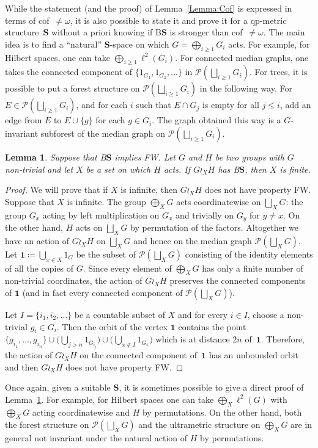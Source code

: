 \documentclass[a4paper]{article}
\newtheorem{lem}{Lemma}[section]
\theoremstyle{definition}
\newcommand*{\BS}{B$\mathbf{S}$}
\newcommand*{\powerset}[1]{\mathcal P(#1)}
\begin{document}
%
%
While the statement (and the proof) of Lemma~\ref{Lemma:Cof} is expressed in terms of cof~$\neq\omega$, it is also possible to state it and prove it for a qp-metric structure~$\mathbf{S}$ without a priori knowing if \BS{} is stronger than cof~$\neq\omega$.
The main idea is to find a ``natural'' $\mathbf S$-space on which $G=\bigoplus_{i\geq 1}G_i$ acts. For example, for Hilbert spaces, one can take $\bigoplus_{i\geq 1}\ell^2(G_i)$. For connected median graphs, one takes the connected component of $\{1_{G_1},1_{G_2},\dots\}$ in $\powerset{\bigsqcup_{i\geq 1} G_i}$.
For trees, it is possible to put a forest structure on $\powerset{\bigsqcup_{i\geq 1} G_i}$ in the following way.
For $E\in\powerset{\bigsqcup_{i\geq 1} G_i}$, and for each $i$ such that $E\cap G_j$ is empty for all $j\leq i$, add an edge from $E$ to $E\cup\{g\}$ for each $g\in G_i$. The graph obtained this way is a $G$-invariant subforest of the median graph on $\powerset{\bigsqcup_{i\geq 1} G_i}$.
%
%
\begin{lem}\label{Lemma:XFinite}
Suppose that \BS{} implies FW.
Let $G$ and $H$ be two groups with $G$ non-trivial and let $X$ be a set on which $H$ acts.
If $G\wr_XH$ has \BS, then $X$ is finite.
\end{lem}
\begin{proof}
We will prove that if $X$ is infinite, then $G\wr_XH$ does not have property FW. Suppose that $X$ is infinite.
The group $\bigoplus_XG$ acts coordinatewise on  $\bigsqcup_XG$: the group $G_x$ acting by left multiplication on $G_x$ and trivially on $G_y$ for $y\neq x$. On the other hand, $H$ acts on $\bigsqcup_XG$ by permutation of the factors.
Altogether we have an action of $G\wr_XH$ on $\bigsqcup_XG$ and hence on the median graph $\powerset{\bigsqcup_XG}$.
Let $\mathbf 1\coloneqq\bigcup_{x\in X} 1_{G}$ be the subset of $\powerset{\bigsqcup_XG}$ consisting of the identity elements of all the copies of $G$.
Since every element of $\bigoplus_XG$ has only a finite number of non-trivial coordinates, the action of $G\wr_XH$ preserves the connected components of $\mathbf 1$ (and in fact every connected component of $\powerset{\bigsqcup_XG}$).

Let $I=\{i_1,i_2,\dots\}$ be a countable subset of $X$ and for every $i\in I$, choose a non-trivial $g_i\in G_{i}$.
Then the orbit of the vertex $\mathbf 1$ contains the point $\{g_{i_1},\dots, g_{i_n}\}\cup\bigl(\bigcup_{j>n} 1_{G_{i_j}}\bigr)\cup\bigl(\bigcup_{x\notin I} 1_{G_{x}}\bigr)$ which is at distance $2n$ of~$\mathbf 1$.
Therefore, the action of $G\wr_XH$ on the connected component of~$\mathbf 1$ has an unbounded orbit and then $G\wr_XH$ does not have property FW.
\end{proof}
%
%
Once again, given a suitable $\mathbf{S}$, it is sometimes possible to give a direct proof of Lemma~\ref{Lemma:XFinite}.
For example, for Hilbert spaces one can take $\bigoplus_X\ell^2(G)$ with $\bigoplus_XG$ acting coordinatewise and $H$ by permutations.
On the other hand, both the forest structure on $\powerset{\bigsqcup_XG}$ and the ultrametric structure on $\bigoplus_XG$ are in general not invariant under the natural action of $H$ by permutations.
\end{document}
